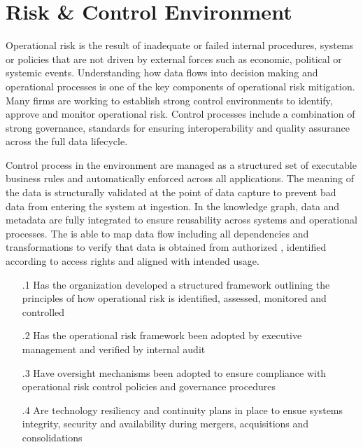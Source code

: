 \section{Risk \& Control Environment}\label{sec:ekgmm-b-4-6} %

Operational risk is the result of inadequate or failed internal procedures,
systems or policies that are not driven by external forces such as economic, political or systemic events.
Understanding how data flows into decision making and operational processes is one of the key components of operational risk mitigation.
Many firms are working to establish strong control environments to identify, approve and monitor operational risk.
Control processes include a combination of strong governance, standards for ensuring interoperability and quality assurance across the full data lifecycle.

\kgmmekgrationalesection

Control process in the  environment are managed as a structured set of executable business rules and automatically enforced across all applications.
The meaning of the data is structurally validated at the point of data capture to prevent bad data from entering the system at ingestion.
In the knowledge graph, data and metadata are fully integrated to ensure reusability across systems and operational processes.
The  is able to map data flow including all dependencies and transformations to verify that data is obtained from authorized ,
identified according to access rights and aligned with intended usage.

\kgmmcorequestionssection

\begin{itemize}[leftmargin=.5in]

  \item [\thesection.1] Has the organization developed a structured framework outlining the principles of how operational risk is identified, assessed, monitored and controlled
  \item [\thesection.2] Has the operational risk framework been adopted by executive management and verified by internal audit
  \item [\thesection.3] Have oversight mechanisms been adopted to ensure compliance with operational risk control policies and governance procedures
  \item [\thesection.4] Are technology resiliency and continuity plans in place to ensue systems integrity, security and availability during mergers, acquisitions and consolidations

\end{itemize}
